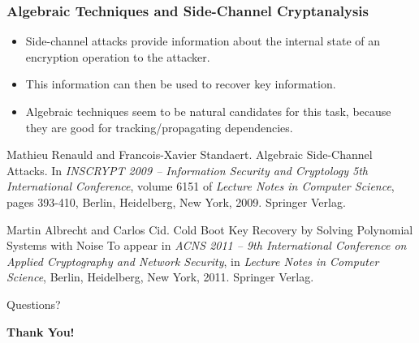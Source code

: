 \documentclass[9pt]{beamer}
\begin{document}
\begin{frame}
\frametitle{Algebraic Techniques and Side-Channel Cryptanalysis} 

\begin{itemize}
 \item Side-channel attacks provide information about the internal state of an encryption operation to the attacker.
 \item This information can then be used to recover key information.
 \item Algebraic techniques seem to be natural candidates for this task, because they are good for tracking/propagating dependencies.
\end{itemize}

\begin{small}
\begin{thebibliography}{}
Mathieu Renauld and Francois-Xavier Standaert.
\newblock Algebraic Side-Channel Attacks.
\newblock In {\em INSCRYPT 2009 -- {I}nformation {S}ecurity and {C}ryptology 5th International Conference}, volume 6151 of {\em Lecture Notes in Computer Science}, pages 393-410, Berlin, Heidelberg, New York, 2009. Springer Verlag.

Martin Albrecht and Carlos Cid.
\newblock Cold Boot Key Recovery by Solving Polynomial Systems with Noise 
\newblock To appear in {\em ACNS 2011 -- 9th International Conference on Applied Cryptography and Network Security}, in {\em Lecture Notes in Computer Science}, Berlin, Heidelberg, New York, 2011. Springer Verlag.
\end{thebibliography}

\end{small}

\end{frame}


\begin{frame}{Questions?}
\begin{center}\textbf{Thank You!}\end{center}
\end{frame}


% 
% 
\end{document}
